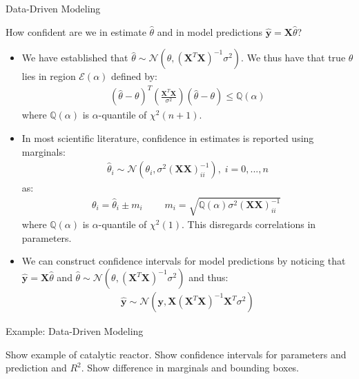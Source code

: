 \documentclass[9pt]{beamer}
\begin{document}
%
\begin{frame}{Data-Driven Modeling}

\begin{block}{}
How confident are we in estimate $\hat{\theta}$ and in model predictions $\hat{\mathbf{y}}=\mathbf{X}\hat{\theta}$?
\end{block}
\begin{itemize}
\item We have established that $\hat{\theta}\sim\mathcal{N}(\theta,(\mathbf{X}^T\mathbf{X})^{-1}\sigma^2)$.  We thus have that true $\theta$ lies in region $\mathcal{E}(\alpha)$ defined by:
\begin{align*}
(\hat{\theta}-\theta)^T\left(\frac{\mathbf{X}^T\mathbf{X}}{\sigma^2}\right)(\hat{\theta}-\theta)\leq \mathbb{Q}(\alpha)
\end{align*}
where $\mathbb{Q}(\alpha)$ is $\alpha$-quantile of $\chi^2(n+1)$.  

\item In most scientific literature, confidence in estimates is reported using marginals:
\begin{align*}
\hat{\theta}_i\sim \mathcal{N}(\theta_i,\sigma^2(\mathbf{X}\mathbf{X})^{-1}_{ii}),\; i=0,...,n
\end{align*}
as:
\begin{align*}
\theta_i=\hat{\theta}_i\pm m_i\;\qquad m_i=\sqrt{\mathbb{Q}(\alpha)\sigma^2(\mathbf{X}\mathbf{X})^{-1}_{ii}}\;
\end{align*}
where  $\mathbb{Q}(\alpha)$ is $\alpha$-quantile of $\chi^2(1)$. This disregards correlations in parameters. 
\item We can construct confidence intervals for model predictions by noticing that $\mathbf{\hat{y}}=\mathbf{X}\hat{\theta}$ and $\hat{\theta}\sim\mathcal{N}(\theta,(\mathbf{X}^T\mathbf{X})^{-1}\sigma^2)$ and thus:
\begin{align*}
\hat{\mathbf{y}}\sim \mathcal{N}(\mathbf{y},\mathbf{X}(\mathbf{X}^T\mathbf{X})^{-1}\mathbf{X}^T\sigma^2)
\end{align*} 
\end{itemize}
\end{frame}

%
\begin{frame}{Example: Data-Driven Modeling}

\begin{block}{}
Show example of catalytic reactor. Show confidence intervals for parameters and prediction and $R^2$. Show difference in marginals and bounding boxes. 
\end{block}

\end{frame}
\end{document}
